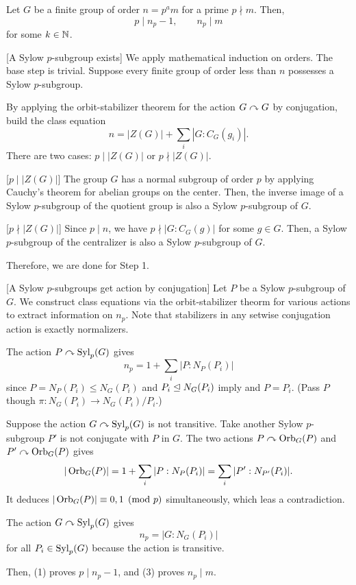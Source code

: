 \documentclass{../exp}
\begin{document}
\begin{thm}[Sylow]
Let $G$ be a finite group of order $n=p^am$ for a prime $p\nmid m$.
Then,
\[p\mid n_p-1,\qquad n_p\mid m\]
for some $k\in\mathbb{N}$.
\end{thm}
\begin{pf}
[A Sylow $p$-subgroup exists]
We apply mathematical induction on orders.
The base step is trivial.
Suppose every finite group of order less than $n$ possesses a Sylow $p$-subgroup.

By applying the orbit-stabilizer theorem for the action $G\curvearrowright G$ by conjugation, build the class equation
\[n=|Z(G)|+\sum_i|G:C_G(g_i)|.\]
There are two cases: $p\mid|Z(G)|$ or $p\nmid|Z(G)|$.

[$p\mid|Z(G)|$]
The group $G$ has a normal subgroup of order $p$ by applying Cauchy's theorem for abelian groups on the center.
Then, the inverse image of a Sylow $p$-subgroup of the quotient group is also a Sylow $p$-subgroup of $G$.

[$p\nmid|Z(G)|$]
Since $p\mid n$, we have $p\nmid|G:C_G(g)|$ for some $g\in G$.
Then, a Sylow $p$-subgroup of the centralizer is also a Sylow $p$-subgroup of $G$.

Therefore, we are done for Step 1.

\bigskip
{}[A Sylow $p$-subgroups get action by conjugation]
Let $P$ be a Sylow $p$-subgroup of $G$.
We construct class equations via the orbit-stabilizer theorm for various actions to extract information on $n_p$.
Note that stabilizers in any setwise conjugation action is exactly normalizers.
\begin{cond}
\item The action $P\curvearrowright\operatorname{Syl}_p(G)$ gives
\[n_p=1+\sum_i|P:N_P(P_i)|\]
since $P=N_P(P_i)\le N_G(P_i)$ and $P_i\trianglelefteq N_G(P_i)$ imply and $P=P_i$.
(Pass $P$ though $\pi:N_G(P_i)\to N_G(P_i)/P_i$.)
\item Suppose the action $G\curvearrowright\operatorname{Syl}_p(G)$ is not transitive.
Take another Sylow $p$-subgroup $P'$ is not conjugate with $P$ in $G$.
The two actions $P\curvearrowright\operatorname{Orb}_G(P)$ and $P'\curvearrowright\operatorname{Orb}_G(P)$ gives
\[|\operatorname{Orb}_G(P)|=1+\sum_i|P:N_P(P_i)|=\sum_i|P':N_{P'}(P_i)|.\]
It deduces $|\operatorname{Orb}_G(P)|\equiv0,1\pmod{p}$ simultaneously, which leas a contradiction.
\item The action $G\curvearrowright\operatorname{Syl}_p(G)$ gives
\[n_p=|G:N_G(P_i)|\]
for all $P_i\in\operatorname{Syl}_p(G)$ because the action is transitive.
\end{cond}
Then, (1) proves $p\mid n_p-1$, and (3) proves $n_p\mid m$.
\end{pf}
\end{document}
